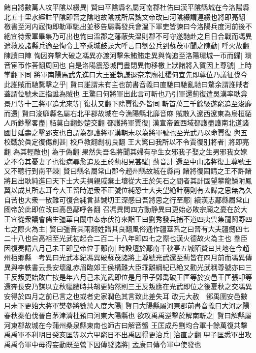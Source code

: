 鮪自將數萬人攻平隂以綴異|{
	賢曰平隂縣名屬河南郡杜佑曰漢平隂縣城在今洛陽縣北五十里水經註平隂即晉之隂地故隂戎所居魏文帝改曰河隂綴謂連綴也將即亮翻}
檄書至河内宼恂即勒軍馳出並移告屬縣發兵會溫下軍吏皆諫曰今洛陽兵度河前後不絶宜待衆軍畢集乃可出也恂曰溫郡之藩蔽失溫則郡不可守遂馳赴之且日合戰而馮異遣救及諸縣兵適至恂令士卒乘城鼓譟大呼言曰劉公兵到蘇茂軍聞之陳動|{
	呼火故翻陳讀曰陣}
恂因奔擊大破之馮異亦渡河擊朱鮪鮪走異與恂追至洛陽環城一帀而歸|{
	環音宦帀作荅翻周回也}
自是洛陽震恐城門晝閉異恂移檄上狀諸將入賀因上尊號|{
	上時掌翻下同}
將軍南陽馬武先進曰大王雖執謙退奈宗廟社稷何宜先即尊位乃議征伐今此誰賊而馳騖擊之乎|{
	賢曰誰謂未有主也前書音義曰直馳曰馳亂馳曰騖余謂誰賊者蓋謂位號未正指誰為賊也}
王驚曰何將軍出此言可斬也乃引軍還薊復遣吳漢率耿弇景丹等十三將軍追尤來等|{
	復扶又翻下除賈復外皆同}
斬首萬三千餘級遂窮追至浚靡而還|{
	賢曰浚靡縣名屬右北平郡故城在今漁陽縣北靡音麻}
賊散入遼西遼東為烏桓貊人所鈔擊畧盡|{
	貊莫白翻鈔楚交翻}
都護將軍賈復|{
	漢宣帝置西域都護盡護南北道諸國甘延壽之擊郅支也自謂為都護將軍漢朝未以為將軍號也至光武乃以命賈復}
與五校戰於眞定復傷創甚|{
	校戶教翻創初良翻}
王大驚曰我所以不令賈復别將者|{
	將即亮翻}
為其輕敵也|{
	為于偽翻}
果然失吾名將聞其婦有孕生女邪我子娶之生男邪我女嫁之不令其憂妻子也復病尋愈追及王於薊相見甚驩|{
	薊音計}
還至中山諸將復上尊號王又不聽行到南平棘|{
	賢曰縣名屬常山郡今趙州縣故城在縣南}
諸將復固請之王不許諸將且出耿純進曰天下士大夫捐親戚棄土壤從大王於矢石之間者其計固望攀龍鱗附鳳翼以成其所志耳今大王留時逆衆不正號位純恐士大夫望絶計窮則有去歸之思無為久自苦也大衆一散難可復合純言甚誠切王深感曰吾將思之行至鄗|{
	續漢志鄗縣屬常山國帝於此即位改曰高邑鄗呼各翻}
召馮異問四方動静異曰更始必敗宗廟之憂在於大王宜從衆議會儒生彊華自關中奉赤伏符來詣王曰劉秀發兵捕不道四夷雲集龍鬭野四七之際火為主|{
	賢曰彊音其兩翻姓譜其良翻風俗通作疆華系之曰晉有大夫疆劒四七二十八也自高祖至光武初起合二百二十八年即四七之際也漢火德故火為主也}
羣臣因復奏請六月己未王即皇帝位于鄗南|{
	時設壇於鄗南千秋亭五城陌賢曰其地在今趙州栢鄉縣　考異曰光武本紀馮異破蘇茂諸將上尊號光武還至薊皆在四月前而馮異傳異與李軼書云長安壞亂赤眉臨郊王侯構難大臣乖離綱紀已絶又勸光武稱尊號亦曰三王反叛更始敗亡按是年六月己未光武即位是月甲子鄧禹破王匡等於安邑王匡張卭等還奔長安乃謀以立秋貙膢時共刼更始然則三王反叛應在光武即位之後夏秋之交馮異安得於四月之前已言之也或者史家潤色其言致此差失耳}
改元大赦　鄧禹圍安邑數月未下更始大將軍樊參將數萬人度大陽|{
	賢曰大陽縣屬河東郡前書音義曰大河之陽春秋秦伯伐晉自茅津濟杜預曰河東大陽縣也}
欲攻禹禹逆擊於解南斬之|{
	賢曰解縣屬河東郡故城在今蒲州桑泉縣東南也師古曰解音蟹}
王匡成丹劉均合軍十餘萬復共擊禹禹軍不利明日癸亥匡等以六甲窮日不出禹因得更治兵|{
	治直之翻}
甲子匡悉軍出攻禹禹令軍中毋得妄動既至營下因傳發諸將|{
	孟康曰傳令軍中使發也}
